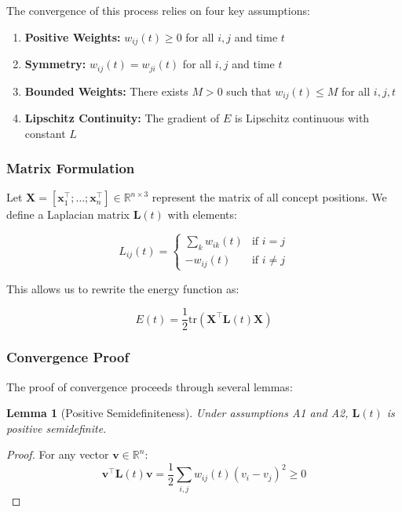 \documentclass{article}
\newtheorem{lemma}{Lemma}
\begin{document}
The convergence of this process relies on four key assumptions:

\begin{enumerate}[label=A\arabic*.]
    \item \textbf{Positive Weights:} $w_{ij}(t) \geq 0$ for all $i,j$ and time $t$
    \item \textbf{Symmetry:} $w_{ij}(t) = w_{ji}(t)$ for all $i,j$ and time $t$
    \item \textbf{Bounded Weights:} There exists $M > 0$ such that $w_{ij}(t) \leq M$ for all $i,j,t$
    \item \textbf{Lipschitz Continuity:} The gradient of $E$ is Lipschitz continuous with constant $L$
\end{enumerate}

\subsubsection{Matrix Formulation}
Let $\mathbf{X} = [\mathbf{x}_1^\top; \ldots; \mathbf{x}_n^\top] \in \mathbb{R}^{n \times 3}$ represent the matrix of all concept positions. We define a Laplacian matrix $\mathbf{L}(t)$ with elements:

\begin{equation}
L_{ij}(t) = \begin{cases}
\sum_k w_{ik}(t) & \text{if } i = j \\
-w_{ij}(t) & \text{if } i \neq j
\end{cases}
\label{eq:laplacian}
\end{equation}

This allows us to rewrite the energy function as:

\begin{equation}
E(t) = \frac{1}{2}\text{tr}(\mathbf{X}^\top\mathbf{L}(t)\mathbf{X})
\label{eq:matrix_energy}
\end{equation}

\subsubsection{Convergence Proof}
The proof of convergence proceeds through several lemmas:

\begin{lemma}[Positive Semidefiniteness]
Under assumptions A1 and A2, $\mathbf{L}(t)$ is positive semidefinite.
\end{lemma}

\begin{proof}
For any vector $\mathbf{v} \in \mathbb{R}^n$:
\begin{equation}
\mathbf{v}^\top\mathbf{L}(t)\mathbf{v} = \frac{1}{2}\sum_{i,j} w_{ij}(t)(v_i - v_j)^2 \geq 0
\end{equation}
\end{proof}
\end{document}
